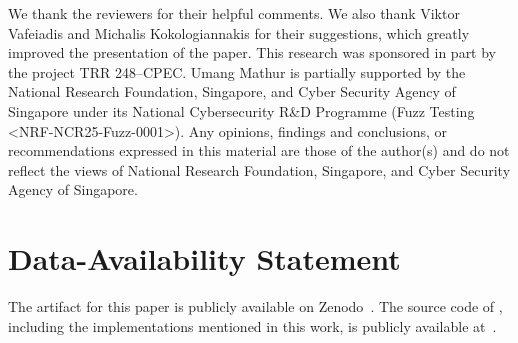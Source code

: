 \documentclass[acmsmall]{acmart}
\begin{document}


%


\begin{acks}
We thank the reviewers for their helpful comments. We also thank Viktor Vafeiadis and Michalis Kokologiannakis for their suggestions, which greatly improved the presentation of the paper. This research was sponsored in part by the  project \href{https://gepris.dfg.de/gepris/projekt/389792660}{} TRR 248–CPEC. Umang Mathur is partially supported by the National Research Foundation, Singapore, and Cyber Security Agency of Singapore under its National Cybersecurity R\&D Programme (Fuzz Testing <NRF-NCR25-Fuzz-0001>). Any opinions, findings and conclusions, or recommendations expressed in this material are those of the author(s) and do not reflect the views of National Research Foundation, Singapore, and Cyber Security Agency of Singapore.
\end{acks}
\section*{Data-Availability Statement}
The artifact for this paper is publicly available on Zenodo~\cite{zenodo_artifact}. The source code of \jmc, including the implementations mentioned in this work, is publicly available at~\cite{jmc}.




\newpage
\appendix



%
\end{document}
